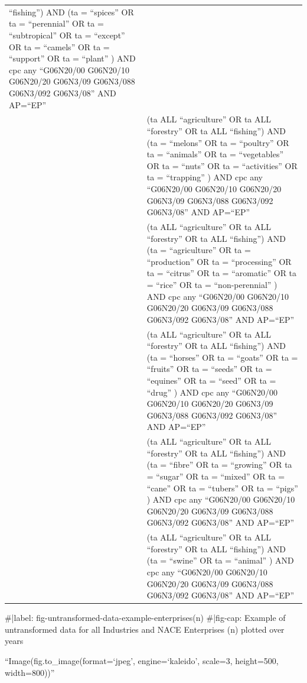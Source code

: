 \documentclass[
  11,
  a4paperpaper,
]{article}
\newenvironment{Shaded}{\begin{snugshade}}{\end{snugshade}}
\newcommand{\NormalTok}[1]{\textcolor[rgb]{0.00,0.23,0.31}{#1}}
\begin{document}
\begin{longtable}[]{@{}
  >{\raggedleft\arraybackslash}p{}
  >{\raggedright\arraybackslash}p{}@{}}
``fishing'') AND (ta = ``spices'' OR ta = ``perennial'' OR ta =
``subtropical'' OR ta = ``except'' OR ta = ``camels'' OR ta =
``support'' OR ta = ``plant'' ) AND cpc any ``G06N20/00 G06N20/10
G06N20/20 G06N3/09 G06N3/088 G06N3/092 G06N3/08'' AND AP=``EP'' \\
5 & (ta ALL ``agriculture'' OR ta ALL ``forestry'' OR ta ALL
``fishing'') AND (ta = ``melons'' OR ta = ``poultry'' OR ta =
``animals'' OR ta = ``vegetables'' OR ta = ``nuts'' OR ta =
``activities'' OR ta = ``trapping'' ) AND cpc any ``G06N20/00 G06N20/10
G06N20/20 G06N3/09 G06N3/088 G06N3/092 G06N3/08'' AND AP=``EP'' \\
6 & (ta ALL ``agriculture'' OR ta ALL ``forestry'' OR ta ALL
``fishing'') AND (ta = ``agriculture'' OR ta = ``production'' OR ta =
``processing'' OR ta = ``citrus'' OR ta = ``aromatic'' OR ta = ``rice''
OR ta = ``non-perennial'' ) AND cpc any ``G06N20/00 G06N20/10 G06N20/20
G06N3/09 G06N3/088 G06N3/092 G06N3/08'' AND AP=``EP'' \\
7 & (ta ALL ``agriculture'' OR ta ALL ``forestry'' OR ta ALL
``fishing'') AND (ta = ``horses'' OR ta = ``goats'' OR ta = ``fruits''
OR ta = ``seeds'' OR ta = ``equines'' OR ta = ``seed'' OR ta = ``drug''
) AND cpc any ``G06N20/00 G06N20/10 G06N20/20 G06N3/09 G06N3/088
G06N3/092 G06N3/08'' AND AP=``EP'' \\
8 & (ta ALL ``agriculture'' OR ta ALL ``forestry'' OR ta ALL
``fishing'') AND (ta = ``fibre'' OR ta = ``growing'' OR ta = ``sugar''
OR ta = ``mixed'' OR ta = ``cane'' OR ta = ``tubers'' OR ta = ``pigs'' )
AND cpc any ``G06N20/00 G06N20/10 G06N20/20 G06N3/09 G06N3/088 G06N3/092
G06N3/08'' AND AP=``EP'' \\
9 & (ta ALL ``agriculture'' OR ta ALL ``forestry'' OR ta ALL
``fishing'') AND (ta = ``swine'' OR ta = ``animal'' ) AND cpc any
``G06N20/00 G06N20/10 G06N20/20 G06N3/09 G06N3/088 G06N3/092 G06N3/08''
AND AP=``EP'' \\
\end{longtable}

\begin{Shaded}
\begin{Highlighting}[]
\NormalTok{\#|label: fig{-}untransformed{-}data{-}example{-}enterprises(n)}
\NormalTok{\#|fig{-}cap: \textquotesingle{}Example of untransformed data for all Industries and NACE Enterprises (n) plotted over years\textquotesingle{}}
\end{Highlighting}
\end{Shaded}

``Image(fig.to\_image(format=`jpeg', engine=`kaleido', scale=3,
height=500, width=800))''
\end{document}
